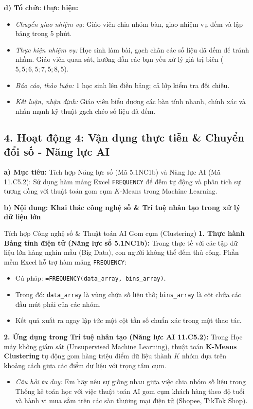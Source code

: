 \documentclass[12pt, a4paper]{article}
\begin{document}
\noindent \textbf{d) Tổ chức thực hiện:}
\begin{itemize}[leftmargin=0.8cm]
    \item \textit{Chuyển giao nhiệm vụ:} Giáo viên chia nhóm bàn, giao nhiệm vụ đếm và lập bảng trong 5 phút.
    \item \textit{Thực hiện nhiệm vụ:} Học sinh làm bài, gạch chân các số liệu đã đếm để tránh nhầm. Giáo viên quan sát, hướng dẫn các bạn yếu xử lý giá trị biên ($5{,}5; 6{,}5; 7{,}5; 8{,}5$).
    \item \textit{Báo cáo, thảo luận:} 1 học sinh lên điền bảng; cả lớp kiểm tra đối chiếu.
    \item \textit{Kết luận, nhận định:} Giáo viên biểu dương các bàn tính nhanh, chính xác và nhấn mạnh kỹ thuật gạch chéo số liệu đã đếm.
\end{itemize}

\subsection*{4. Hoạt động 4: Vận dụng thực tiễn \& Chuyển đổi số - Năng lực AI}

\noindent \textbf{a) Mục tiêu:}
Tích hợp Năng lực số (Mã 5.1NC1b) và Năng lực AI (Mã 11.C5.2): Sử dụng hàm mảng Excel \texttt{FREQUENCY} để đếm tự động và phân tích sự tương đồng với thuật toán gom cụm $K$-Means trong Machine Learning.

\noindent \textbf{b) Nội dung: Khai thác công nghệ số \& Trí tuệ nhân tạo trong xử lý dữ liệu lớn}
\begin{aibox}{Tích hợp Công nghệ số \& Thuật toán AI Gom cụm (Clustering)}
\textbf{1. Thực hành Bảng tính điện tử (Năng lực số 5.1NC1b):}
Trong thực tế với các tập dữ liệu lớn hàng nghìn mẫu (Big Data), con người không thể đếm thủ công. Phần mềm Excel hỗ trợ hàm mảng \texttt{FREQUENCY}:
\begin{itemize}[leftmargin=0.6cm]
    \item Cú pháp: \texttt{=FREQUENCY(data\_array, bins\_array)}.
    \item Trong đó: \texttt{data\_array} là vùng chứa số liệu thô; \texttt{bins\_array} là cột chứa các đầu mút phải của các nhóm.
    \item Kết quả xuất ra ngay lập tức một cột tần số chuẩn xác trong một thao tác.
\end{itemize}
\textbf{2. Ứng dụng trong Trí tuệ nhân tạo (Năng lực AI 11.C5.2):}
Trong Học máy không giám sát (Unsupervised Machine Learning), thuật toán \textbf{K-Means Clustering} tự động gom hàng triệu điểm dữ liệu thành $K$ nhóm dựa trên khoảng cách giữa các điểm dữ liệu với trọng tâm cụm.
\begin{itemize}[leftmargin=0.6cm]
    \item \textit{Câu hỏi tư duy:} Em hãy nêu sự giống nhau giữa việc chia nhóm số liệu trong Thống kê toán học với việc thuật toán AI gom cụm khách hàng theo độ tuổi và hành vi mua sắm trên các sàn thương mại điện tử (Shopee, TikTok Shop).
\end{itemize}
\end{aibox}
\end{document}
